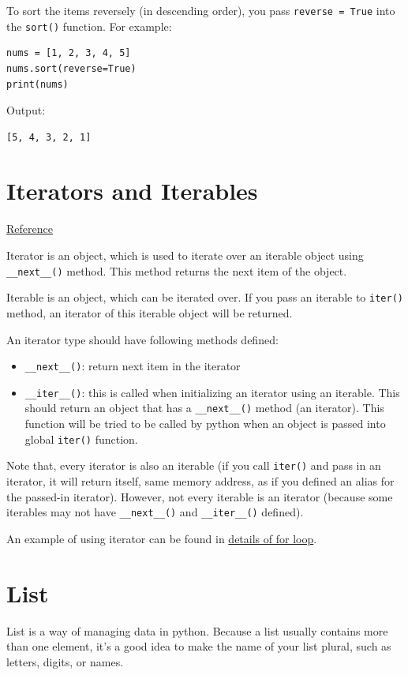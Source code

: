 \documentclass[12pt]{book}
\begin{document}
To sort the items reversely (in descending order), you pass \texttt{reverse = True} into the \texttt{sort()} function. For example:
\begin{verbatim}
nums = [1, 2, 3, 4, 5]
nums.sort(reverse=True)
print(nums)
\end{verbatim}
Output:
\begin{verbatim}
[5, 4, 3, 2, 1]
\end{verbatim}
\section{Iterators and Iterables \label{org878dc67}}
\label{sec:org0bd089c}
\href{https://www.geeksforgeeks.org/python-difference-iterable-iterator/}{Reference}

Iterator is an object, which is used to iterate over an iterable object using \texttt{\_\_next\_\_()} method. This method returns the next item of the object. 

Iterable is an object, which can be iterated over. If you pass an iterable to \texttt{iter()} method, an iterator of this iterable object will be returned.

An iterator type should have following methods defined:
\begin{itemize}
\item \texttt{\_\_next\_\_()}: return next item in the iterator
\item \texttt{\_\_iter\_\_()}: this is called when initializing an iterator using an iterable. This should return an object that has a \texttt{\_\_next\_\_()} method (an iterator). This function will be tried to be called by python when an object is passed into global \texttt{iter()} function.
\end{itemize}

Note that, every iterator is also an iterable (if you call \texttt{iter()} and pass in an iterator, it will return itself, same memory address, as if you defined an alias for the passed-in iterator). However, not every iterable is an iterator (because some iterables may not have \texttt{\_\_next\_\_()} and \texttt{\_\_iter\_\_()} defined).

An example of using iterator can be found in \hyperref[orgb89de93]{details of for loop}.
\section{List}
\label{sec:orgb777ec9}
List is a way of managing data in python. Because a list usually contains more than one element, it’s a good idea to make the name of your list plural, such as letters, digits, or names.
\end{document}
